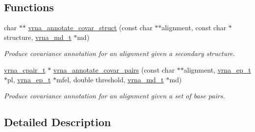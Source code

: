 \subsection*{Functions}
\begin{DoxyCompactItemize}
\item 
\mbox{\label{group__annotation__utils_gae0305bbf95eddd4a57648a1e4739a7f3}} 
char $\ast$$\ast$ \hyperlink{group__annotation__utils_gae0305bbf95eddd4a57648a1e4739a7f3}{vrna\+\_\+annotate\+\_\+covar\+\_\+struct} (const char $\ast$$\ast$alignment, const char $\ast$structure, \hyperlink{group__model__details_ga1f8a10e12a0a1915f2a4eff0b28ea17c}{vrna\+\_\+md\+\_\+t} $\ast$md)
\begin{DoxyCompactList}\small\item\em Produce covariance annotation for an alignment given a secondary structure. \end{DoxyCompactList}\item 
\mbox{\label{group__annotation__utils_gadb9ba32197f05d5876d389b2ba92edac}} 
\hyperlink{group__data__structures_gae4fc91141cc69c6d8eaf1332cb991ecc}{vrna\+\_\+cpair\+\_\+t} $\ast$ \hyperlink{group__annotation__utils_gadb9ba32197f05d5876d389b2ba92edac}{vrna\+\_\+annotate\+\_\+covar\+\_\+pairs} (const char $\ast$$\ast$alignment, \hyperlink{group__struct__utils_gab9ac98ab55ded9fb90043b024b915aca}{vrna\+\_\+ep\+\_\+t} $\ast$pl, \hyperlink{group__struct__utils_gab9ac98ab55ded9fb90043b024b915aca}{vrna\+\_\+ep\+\_\+t} $\ast$mfel, double threshold, \hyperlink{group__model__details_ga1f8a10e12a0a1915f2a4eff0b28ea17c}{vrna\+\_\+md\+\_\+t} $\ast$md)
\begin{DoxyCompactList}\small\item\em Produce covariance annotation for an alignment given a set of base pairs. \end{DoxyCompactList}\end{DoxyCompactItemize}


\subsection{Detailed Description}
